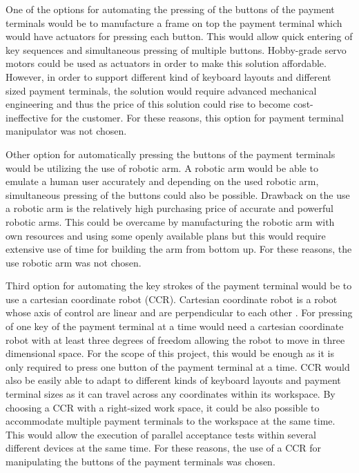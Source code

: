 One of the options for automating the pressing of the buttons of the payment terminals would be to manufacture a frame on top the payment terminal which would have actuators for pressing each button. This would allow quick entering of key sequences and simultaneous pressing of multiple buttons. Hobby-grade servo motors could be used as actuators in order to make this solution affordable. However, in order to support different kind of keyboard layouts and different sized payment terminals, the solution would require advanced mechanical engineering and thus the price of this solution could rise to become cost-ineffective for the customer. For these reasons, this option for payment terminal manipulator was not chosen.

Other option for automatically pressing the buttons of the payment terminals would be utilizing the use of robotic arm. A robotic arm would be able to emulate a human user accurately and depending on the used robotic arm, simultaneous pressing of the buttons could also be possible. Drawback on the use a robotic arm is the relatively high purchasing price of accurate and powerful robotic arms. This could be overcame by manufacturing the robotic arm with own resources and using some openly available plans \citep{bcn3d} but this would require extensive use of time for building the arm from bottom up. For these reasons, the use robotic arm was not chosen.

Third option for automating the key strokes of the payment terminal would be to use a cartesian coordinate robot (CCR). Cartesian coordinate robot is a robot whose axis of control are linear and are perpendicular to each other \citep{costa1995three}. For pressing of one key of the payment terminal at a time would need a cartesian coordinate robot with at least three degrees of freedom allowing the robot to move in three dimensional space. For the scope of this project, this would be enough as it is only required to press one button of the payment terminal at a time. CCR would also be easily able to adapt to different kinds of keyboard layouts and payment terminal sizes as it can travel across any coordinates within its workspace. By choosing a CCR with a right-sized work space, it could be also possible to accommodate multiple payment terminals to the workspace at the same time. This would allow the execution of parallel acceptance tests within several different devices at the same time. For these reasons, the use of a CCR for manipulating the buttons of the payment terminals was chosen.

